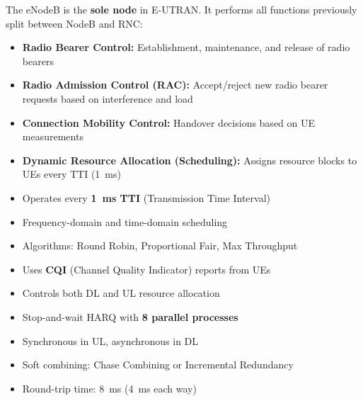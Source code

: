 

The eNodeB is the \textbf{sole node} in E-UTRAN. It performs all functions previously split between NodeB and RNC:


\begin{itemize}
\tightlist
\item
  \textbf{Radio Bearer Control:} Establishment, maintenance, and release of radio bearers
\item
  \textbf{Radio Admission Control (RAC):} Accept/\allowbreak{}reject new radio bearer requests based on interference and load
\item
  \textbf{Connection Mobility Control:} Handover decisions based on UE measurements
\item
  \textbf{Dynamic Resource Allocation (Scheduling):} Assigns resource blocks to UEs every TTI (1~ms)
\end{itemize}


\begin{itemize}
\tightlist
\item
  Operates every \textbf{1~ms TTI} (Transmission Time Interval)
\item
  Frequency-domain and time-domain scheduling
\item
  Algorithms: Round Robin, Proportional Fair, Max Throughput
\item
  Uses \textbf{CQI} (Channel Quality Indicator) reports from UEs
\item
  Controls both DL and UL resource allocation
\end{itemize}


\begin{itemize}
\tightlist
\item
  Stop-and-wait HARQ with \textbf{8 parallel processes}
\item
  Synchronous in UL, asynchronous in DL
\item
  Soft combining: Chase Combining or Incremental Redundancy
\item
  Round-trip time: 8~ms (4~ms each way)
\end{itemize}


